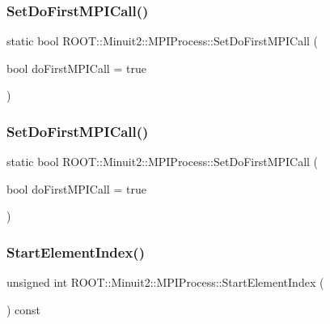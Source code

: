 \subsubsection{\texorpdfstring{SetDoFirstMPICall()}{SetDoFirstMPICall()}\hspace{0.1cm}{\footnotesize\ttfamily [2/3]}}
{\footnotesize\ttfamily static bool R\+O\+O\+T\+::\+Minuit2\+::\+M\+P\+I\+Process\+::\+Set\+Do\+First\+M\+P\+I\+Call (\begin{DoxyParamCaption}\item[{bool}]{do\+First\+M\+P\+I\+Call = {\ttfamily true} }\end{DoxyParamCaption})\hspace{0.3cm}{\ttfamily [static]}}

\mbox{\label{classROOT_1_1Minuit2_1_1MPIProcess_ae4e6932bbb197c4bff1a17ed3a8b0670}} 
\subsubsection{\texorpdfstring{SetDoFirstMPICall()}{SetDoFirstMPICall()}\hspace{0.1cm}{\footnotesize\ttfamily [3/3]}}
{\footnotesize\ttfamily static bool R\+O\+O\+T\+::\+Minuit2\+::\+M\+P\+I\+Process\+::\+Set\+Do\+First\+M\+P\+I\+Call (\begin{DoxyParamCaption}\item[{bool}]{do\+First\+M\+P\+I\+Call = {\ttfamily true} }\end{DoxyParamCaption})\hspace{0.3cm}{\ttfamily [static]}}

\mbox{\label{classROOT_1_1Minuit2_1_1MPIProcess_a9e6b2dc6f57cc91bb11637b50ba15957}} 
\subsubsection{\texorpdfstring{StartElementIndex()}{StartElementIndex()}\hspace{0.1cm}{\footnotesize\ttfamily [1/3]}}
{\footnotesize\ttfamily unsigned int R\+O\+O\+T\+::\+Minuit2\+::\+M\+P\+I\+Process\+::\+Start\+Element\+Index (\begin{DoxyParamCaption}{ }\end{DoxyParamCaption}) const\hspace{0.3cm}{\ttfamily [inline]}}

